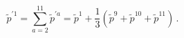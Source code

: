 \begin{equation}
 \tilde p^{\prime 1} =\sum_{a=2}^{11}\tilde p^{\prime a}= \tilde p^1 +
\frac{1}{3}(\tilde p^{9}+\tilde p^{10}+\tilde p^{11})\, .
\end{equation} 
